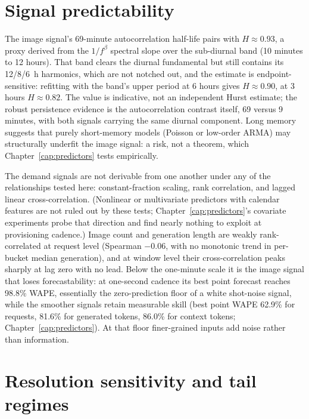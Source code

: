 \section{Signal predictability}
\label{sec:eda-predictability}

The image signal's 69-minute autocorrelation half-life pairs with
$H \approx 0.93$, a proxy derived from the $1/f^{\beta}$ spectral slope over the
sub-diurnal band (10 minutes to 12 hours). That band clears the diurnal
fundamental but still contains its 12/8/\SI{6}{\hour} harmonics, which are not
notched out, and the estimate is endpoint-sensitive: refitting with the band's
upper period at 6 hours gives $H \approx 0.90$, at 3 hours $H \approx 0.82$. The
value is indicative, not an independent Hurst estimate; the robust persistence
evidence is the autocorrelation contrast itself, 69 versus 9 minutes, with both
signals carrying the same diurnal component. Long memory suggests that purely
short-memory models (Poisson or low-order ARMA) may structurally underfit the
image signal: a risk, not a theorem, which Chapter~\ref{cap:predictors} tests
empirically.

The demand signals are not derivable from one another under any of the
relationships tested here: constant-fraction scaling, rank correlation, and
lagged linear cross-correlation. (Nonlinear or multivariate predictors with
calendar features are not ruled out by these tests;
Chapter~\ref{cap:predictors}'s covariate experiments probe that direction and
find nearly nothing to exploit at provisioning cadence.) Image count and
generation length are weakly rank-correlated at request level (Spearman
$-0.06$, with no monotonic trend in per-bucket median generation), and at
window level their
cross-correlation peaks sharply at lag zero with no lead. Below the one-minute
scale it is the image signal that loses forecastability: at
one-second cadence its best point forecast reaches 98.8\% WAPE, essentially the
zero-prediction floor of a white shot-noise signal, while the smoother signals
retain measurable skill (best point WAPE 62.9\% for requests, 81.6\% for
generated tokens, 86.0\% for context tokens; Chapter~\ref{cap:predictors}). At
that floor finer-grained inputs add noise rather than information.

\section{Resolution sensitivity and tail regimes}
\label{sec:eda-multires}

